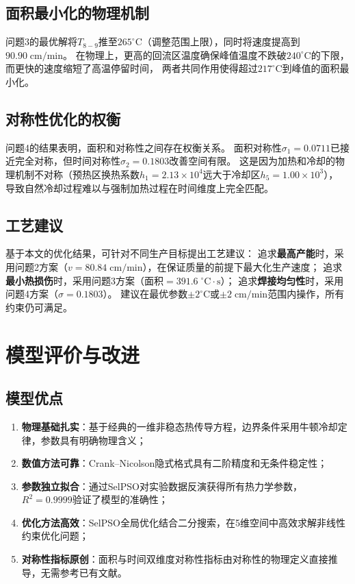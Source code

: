 \documentclass[12pt,a4paper]{ctexart}
\begin{document}
\subsection{面积最小化的物理机制}

问题3的最优解将$T_{8-9}$推至$265^{\circ}\mathrm{C}$（调整范围上限），同时将速度提高到$90.90\;\mathrm{cm/min}$。
在物理上，更高的回流区温度确保峰值温度不跌破$240^{\circ}\mathrm{C}$的下限，而更快的速度缩短了高温停留时间，
两者共同作用使得超过$217^{\circ}\mathrm{C}$到峰值的面积最小化。

\subsection{对称性优化的权衡}

问题4的结果表明，面积和对称性之间存在权衡关系。
面积对称性$\sigma_1=0.0711$已接近完全对称，但时间对称性$\sigma_2=0.1803$改善空间有限。
这是因为加热和冷却的物理机制不对称（预热区换热系数$h_1=2.13\times10^{4}$远大于冷却区$h_5=1.00\times10^{3}$），
导致自然冷却过程难以与强制加热过程在时间维度上完全匹配。

\subsection{工艺建议}

基于本文的优化结果，可针对不同生产目标提出工艺建议：
追求\textbf{最高产能}时，采用问题2方案（$v=80.84\;\mathrm{cm/min}$），在保证质量的前提下最大化生产速度；
追求\textbf{最小热损伤}时，采用问题3方案（面积$=391.6\;^{\circ}\mathrm{C}\!\cdot\!\mathrm{s}$）；
追求\textbf{焊接均匀性}时，采用问题4方案（$\sigma=0.1803$）。
建议在最优参数$\pm2^{\circ}\mathrm{C}$或$\pm2\;\mathrm{cm/min}$范围内操作，所有约束仍可满足。

\section{模型评价与改进}

\subsection{模型优点}

\begin{enumerate}[nosep]
    \item \textbf{物理基础扎实}：基于经典的一维非稳态热传导方程，边界条件采用牛顿冷却定律，参数具有明确物理含义；
    \item \textbf{数值方法可靠}：Crank--Nicolson隐式格式具有二阶精度和无条件稳定性；
    \item \textbf{参数独立拟合}：通过SelPSO对实验数据反演获得所有热力学参数，$R^2=0.9999$验证了模型的准确性；
    \item \textbf{优化方法高效}：SelPSO全局优化结合二分搜索，在5维空间中高效求解非线性约束优化问题；
    \item \textbf{对称性指标原创}：面积与时间双维度对称性指标由对称性的物理定义直接推导，无需参考已有文献。
\end{enumerate}
\end{document}
